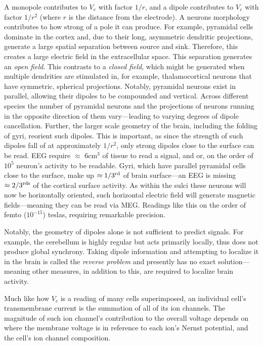 A monopole contributes to $V_e$ with factor $1/r$, and a dipole contributes to $V_e$ with factor $1/r^2$ (where $r$ is the distance from the electrode). A neurons morphology contributes to how strong of a pole it can produce. For example, pyramidal cells dominate in the cortex and, due to their long, asymmetric dendritic projections, generate a large spatial separation between source and sink. Therefore, this creates a large electric field in the extracellular space. This separation generates an \textit{open field}. This contrasts to a \textit{closed field}, which might be generated when multiple dendrities are stimulated in, for example, thalamocortical neurons that have symmetric, spherical projections. Notably, pyramidal neurons exist in parallel, allowing their dipoles to be compounded and vertical. Across different species the number of pyramidal neurons and the projections of neurons running in the opposite direction of them vary---leading to varying degrees of dipole cancellation. Further, the larger scale geometry of the brain, including the folding of gyri, reorient such dipoles. This is important, as since the strength of such dipoles fall of at approximately $1/r^2$, only strong dipoles close to the surface can be read. EEG require $\approx$ 6cm$^3$ of tissue to read a signal, and or, on the order of $10^5$ neuron's activity to be readable. Gyri, which have parallel pyramidal cells close to the surface, make up $\approx 1/3^{\rm rd}$ of brain surface---an EEG is missing $\approx 2/3^{\rm rds}$ of the cortical surface activity. As within the sulci these neurons will now be horizontally oriented, such horizontal electric field will generate magnetic fields---meaning they can be read via MEG. Readings like this on the order of femto ($10^{-15}$) teslas, requiring remarkable precision.\newline

Notably, the geometry of dipoles alone is not sufficient to predict signals. For example, the cerebellum is highly regular but acts primarily locally, thus does not produce global synchrony. Taking dipole information and attempting to localize it in the brain is called the \textit{reverse problem} and presently has no exact solution---meaning other measures, in addition to this, are required to localize brain activity.\newline
    
Much like how $V_e$ is a reading of many cells superimposed, an individual cell's transmembrane current is the summation of all of its ion channels. The magnitude of such ion channel's contribution to the overall voltage depends on where the membrane voltage is in reference to each ion's Nernst potential, and the cell's ion channel composition.\newline

